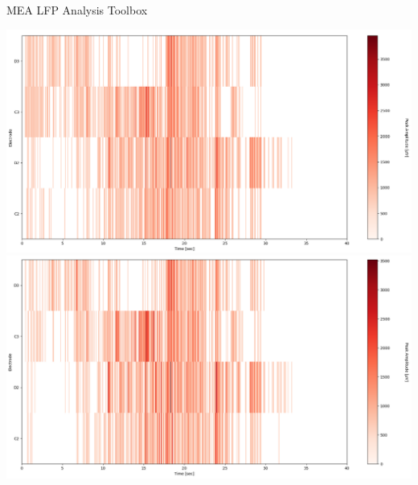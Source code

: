 \documentclass[10pt]{beamer}
\begin{document}
\begin{frame}[allowframebreaks]{MEA LFP Analysis Toolbox}
\begin{itemize}
      \framebreak
      \begin{center}
      \includegraphics[keepaspectratio,width=0.58\framewidth]{img/4_raster_amplitude.png}
      \includegraphics[keepaspectratio,width=0.58\framewidth]{img/4_raster_avg.png}
      \end{center}
      \framebreak
      

\end{itemize}
\end{frame}
\end{document}
